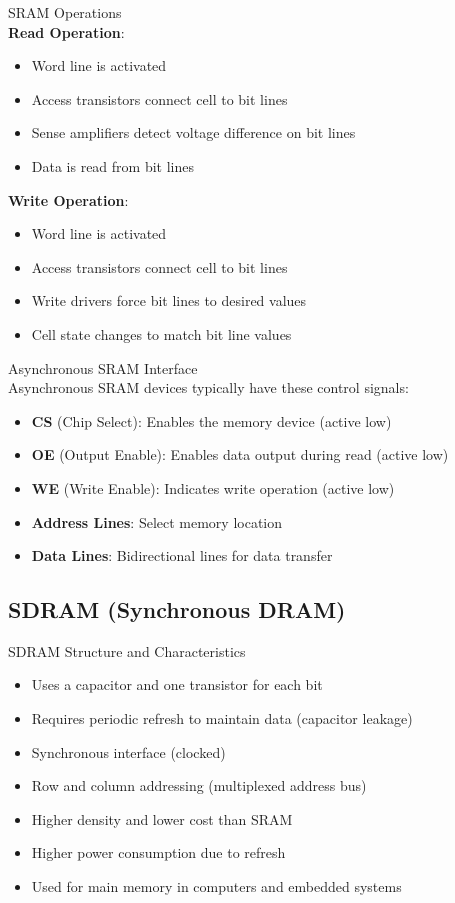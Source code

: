 \begin{definition}{SRAM Operations}\\
\textbf{Read Operation}:
\begin{itemize}
    \item Word line is activated
    \item Access transistors connect cell to bit lines
    \item Sense amplifiers detect voltage difference on bit lines
    \item Data is read from bit lines
\end{itemize}
\textbf{Write Operation}:
\begin{itemize}
    \item Word line is activated
    \item Access transistors connect cell to bit lines
    \item Write drivers force bit lines to desired values
    \item Cell state changes to match bit line values
\end{itemize}
\end{definition}

\begin{definition}{Asynchronous SRAM Interface}\\
Asynchronous SRAM devices typically have these control signals:
\begin{itemize}
    \item \textbf{CS} (Chip Select): Enables the memory device (active low)
    \item \textbf{OE} (Output Enable): Enables data output during read (active low)
    \item \textbf{WE} (Write Enable): Indicates write operation (active low)
    \item \textbf{Address Lines}: Select memory location
    \item \textbf{Data Lines}: Bidirectional lines for data transfer
\end{itemize}
\end{definition}

\subsection{SDRAM (Synchronous DRAM)}

\begin{concept}{SDRAM Structure and Characteristics}
\begin{itemize}
    \item Uses a capacitor and one transistor for each bit
    \item Requires periodic refresh to maintain data (capacitor leakage)
    \item Synchronous interface (clocked)
    \item Row and column addressing (multiplexed address bus)
    \item Higher density and lower cost than SRAM
    \item Higher power consumption due to refresh
    \item Used for main memory in computers and embedded systems
\end{itemize}
\end{concept}

